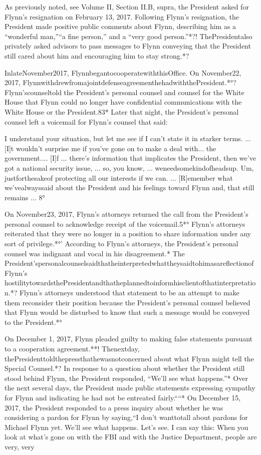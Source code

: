 As previously noted, see Volume II, Section II.B, supra, the President asked for Flynn's resignation on February 13, 2017.
Following Flynn's resignation, the President made positive public comments about Flynn, describing him as a “wonderful man,”“a fine person,” and a “very good person.”*?!
ThePresidentalso privately asked advisors to pass messages to Flynn conveying that the President still cared about him and encouraging him to stay strong.*?

InlateNovember2017, FlynnbegantocooperatewiththisOffice. On November22, 2017, FlynnwithdrewfromajointdefenseagreementhehadwiththePresident.*°? Flynn'scounseltold the President's personal counsel and counsel for the White House that Flynn could no longer have confidential communications with the White House or the President.83* Later that night, the President's personal counsel left a voicemail for Flynn's counsel that said:

I understand your situation, but let me see if I can't state it in starker terms. ...
[I]t wouldn't surprise me if you've gone on to make a deal with... the government....
[I]f ... there's information that implicates the President, then we've got a national security issue, ... so, you know, ... weneedsomekindofheadsup.
Um, justforthesakeof protecting all our interests if we can. ...
[R]emember what we'vealwayssaid about the President and his feelings toward Flynn and, that still remains ... 8°

On November23, 2017, Flynn's attorneys returned the call from the President's personal counsel to acknowledge receipt of the voicemail.5*°
Flynn's attorneys reiterated that they were no longer in a position to share information under any sort of privilege.*°'
According to Flynn's attorneys, the President's personal counsel was indignant and vocal in his disagreement.*
The President'spersonalcounselsaidthatheinterpretedwhattheysaidtohimasareflectionofFlynn's hostilitytowardsthePresidentandthatheplannedtoinformhisclientofthatinterpretation.*?
Flynn's attorneys understood that statement to be an attempt to make them reconsider their position because the President's personal counsel believed that Flynn would be disturbed to know that such a message would be conveyed to the President.*°

On December 1, 2017, Flynn pleaded guilty to making false statements pursuant to a cooperation agreement.**!
Thenextday, thePresidenttoldthepressthathewasnotconcerned about what Flynn might tell the Special Counsel.*?
In response to a question about whether the President still stood behind Flynn, the President responded, “We'll see what happens.”*
Over the next several days, the President made public statements expressing sympathy for Flynn and indicating he had not be entreated fairly.““*
On December 15, 2017, the President responded to a press inquiry about whether he was considering a pardon for Flynn by saying,“I don't wanttotall about pardons for Michael Flynn yet.
We'll see what happens.
Let's see.
I can say this: When you look at what's gone on with the FBI and with the Justice Department, people are very, very

